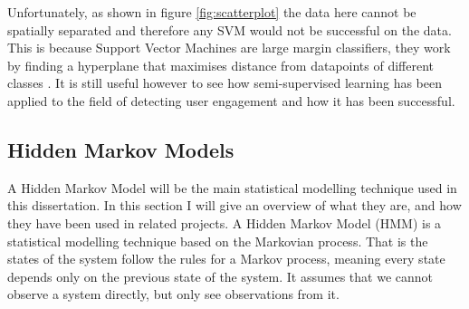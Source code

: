 \documentclass{article}
\begin{document}
Unfortunately, as shown in figure \ref{fig:scatterplot} the data here cannot be spatially separated and therefore any SVM would not be successful on the data.
This is because Support Vector Machines are large margin classifiers, they work by finding a hyperplane that maximises distance from datapoints of different classes \cite{campbell2000query}. 
It is still useful however to see how semi-supervised learning has been applied to the field of detecting user engagement and how it has been successful.

%   

\subsection{Hidden Markov Models}






A Hidden Markov Model will be the main statistical modelling technique used in this dissertation.
In this section I will give an overview of what they are, and how they have been used in related projects.
A Hidden Markov Model (HMM) is a statistical modelling technique based on the Markovian process. %
That is the states of the system follow the rules for a Markov process, meaning every state depends only on the previous state of the system.
It assumes that we cannot observe a system directly, but only see observations from it.
\end{document}
